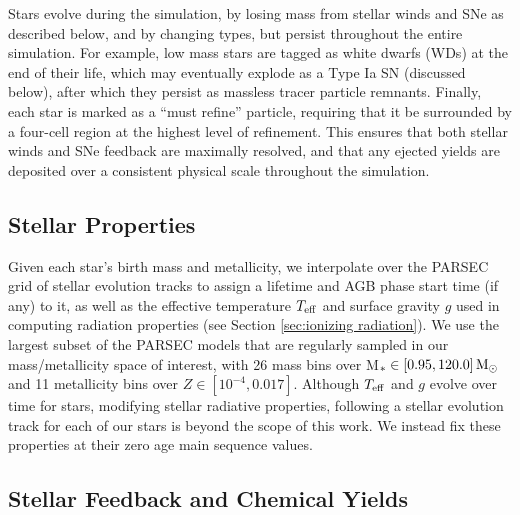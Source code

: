 \documentclass[fleqn,usenatbib,useAMS]{mnras}
\begin{document}
Stars evolve during the simulation, by losing mass from stellar winds and SNe as described below, and by changing types, but persist throughout the entire simulation. For example, low mass stars are tagged as white dwarfs (WDs) at the end of their life, which may eventually explode as a Type Ia SN (discussed below), after which they persist as massless tracer particle remnants. Finally, each star is marked as a ``must refine'' particle, requiring that it be surrounded by a four-cell region at the highest level of refinement. This ensures that both stellar winds and SNe feedback are maximally resolved, and that any ejected yields are deposited over a consistent physical scale throughout the simulation.

\subsection{Stellar Properties}
\label{sec:properties}
Given each star's birth mass and metallicity, we interpolate over the PARSEC grid of stellar evolution tracks \citep{Bressan2012} to assign a lifetime and AGB phase start time (if any) to it, as well as the effective temperature $T_{\rm eff}$ and surface gravity $g$ used in computing radiation properties (see Section \ref{sec:ionizing radiation}). We use the largest subset of the PARSEC models that are regularly sampled in our mass/metallicity space of interest, with 26 mass bins over M$_{*} \in \left[0.95, 120.0 \right] {\rm M_{\odot}}$ and 11 metallicity bins over $Z \in \left[10^{-4}, 0.017 \right]$. Although $T_{\rm eff}$ and $g$ evolve over time for stars, modifying stellar radiative properties, following a stellar evolution track for each of our stars is beyond the scope of this work. We instead fix these properties at their zero age main sequence values.

\subsection{Stellar Feedback and Chemical Yields}
\end{document}
